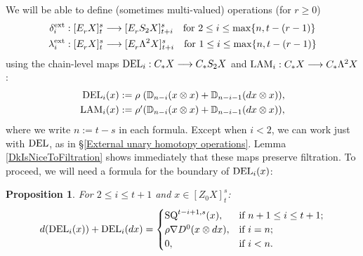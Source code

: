 \documentclass[11pt]{amsart} \renewcommand{\baselinestretch}{1.2}
\theoremstyle{plain}
\newtheorem{prop}[thm]{Proposition}
\theoremstyle{definition}
\renewcommand{\to}{\longrightarrow}
\newcommand{\Nabla}{\nabla}
\newcommand{\Edownup}[5]{[E_{#1}^{#2}#3]^{#4}_{#5}}
\newcommand{\EZdownup}[5]{[Z^{#2}_{#1}#3]^{#4}_{#5}}
\renewcommand{\mapsto}{\longmapsto}
\begin{document}
\begin{second quadrant homotopy sseq operations}
We will be able to define (sometimes multi-valued) operations (for $r\geq 0$)
\begin{gather*}
\delta^\textup{ext}_i:\Edownup{r}{}{X}{s}{t}\to \Edownup{r}{}{S_2X}{s}{t+i}\textup{\ \ \ for $2\leq i\leq\max\{n,t-(r-1)\}$}\\
\lambda^\textup{ext}_i:\Edownup{r}{}{X}{s}{t}\to \Edownup{r}{}{\Lambda^2X}{s}{t+i}\textup{\ \ \ for $1\leq i\leq\max\{n,t-(r-1)\}$}
\end{gather*}
using the chain-level maps $\textup{DEL}_{i}:C_*X\to C_*S_2X$ and $\textup{LAM}_{i}:C_*X\to C_*\Lambda^2X$:
\begin{alignat*}{2}
\textup{DEL}_{i}(x)&:=\makebox[\widthof{$\rho'$}][l]{$\rho$}(\mathbb{D}_{n-i}(x\otimes x)+\mathbb{D}_{n-i-1}(dx\otimes x)),\\
\textup{LAM}_{i}(x)&:=\makebox[\widthof{$\rho'$}][l]{$\rho'$}(\mathbb{D}_{n-i}(x\otimes x)+\mathbb{D}_{n-i-1}(dx\otimes x)),
\end{alignat*}
where we write $n:=t-s$ in each formula. Except when $i<2$, we  can work just with $\textup{DEL}$, as in \S\ref{External unary homotopy operations}. Lemma \ref{DkIsNiceToFiltration} shows immediately that these maps  preserve filtration. 
To proceed, we will need a formula for the boundary of $\textup{DEL}_i(x)$:
\begin{prop}
\label{dvsDEL}
For $2\leq i\leq t+1$ and $x\in \EZdownup{0}{}{X}{s}{t}$:
\[d(\textup{DEL}_i(x))+ \textup{DEL}_i(dx)=\begin{cases}
\textup{SQ}^{t-i+1,s}(x),&\textup{if }n+1\leq i \leq t+1;\\
\rho\Nabla D^0(x\otimes dx),&\textup{if }i=n;\\
0,&\textup{if }i< n.
\end{cases}\]


\end{prop}
\end{second quadrant homotopy sseq operations}
\end{document}
